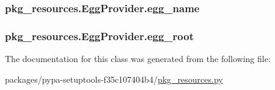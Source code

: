 \subsubsection[{egg\+\_\+name}]{\setlength{\rightskip}{0pt plus 5cm}pkg\+\_\+resources.\+Egg\+Provider.\+egg\+\_\+name}\label{classpkg__resources_1_1EggProvider_a3ad4e46d4d17d838fa87cd90c9ae5356}
\hypertarget{classpkg__resources_1_1EggProvider_a4f493d581c0d65f2d2960d9594138f24}{}
\subsubsection[{egg\+\_\+root}]{\setlength{\rightskip}{0pt plus 5cm}pkg\+\_\+resources.\+Egg\+Provider.\+egg\+\_\+root}\label{classpkg__resources_1_1EggProvider_a4f493d581c0d65f2d2960d9594138f24}


The documentation for this class was generated from the following file\+:\begin{DoxyCompactItemize}
\item 
packages/pypa-\/setuptools-\/f35c107404b4/\hyperlink{pkg__resources_8py}{pkg\+\_\+resources.\+py}\end{DoxyCompactItemize}
